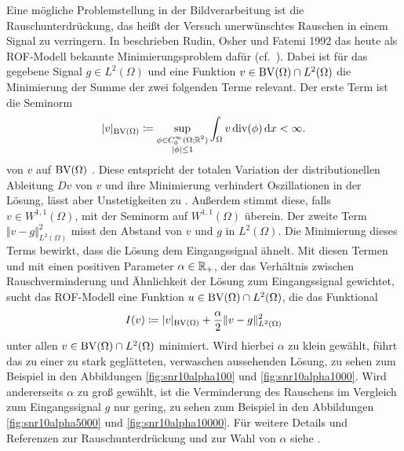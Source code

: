 Eine mögliche Problemstellung in der Bildverarbeitung ist die 
Rauschunterdrü\-ckung, das heißt der Versuch unerwünschtes Rauschen in einem
Signal zu verringern.
In \cite{ROF92} beschrieben Rudin, Osher und Fatemi 1992 das heute als
ROF-Modell bekannte Minimierungsproblem dafür (cf.\
\cites[1217]{Bar15a}[132]{CP10}[S. 74 f.]{Get12}).
Dabei ist für das gegebene Signal $g\in L^2(\Omega)$ und 
eine Funktion $v\in\textup{BV}(\Omega)\cap L^2(\Omega)$ die Minimierung
der Summe der zwei folgenden Terme relevant.
Der erste Term ist die
Seminorm
\begin{align*}
  |v|_{\textup{BV}(\Omega)}
  \coloneqq
  \sup_{\substack{\phi\in C^\infty_0(\Omega;\mathbb{R}^2)\\
  |\phi|\leq 1}}\int_\Omega v\operatorname{div} (\phi)\,\mathrm{d}x
  <
  \infty.
\end{align*}
von $v$ auf $\textup{BV}(\Omega)$ \cite[1162]{Bar12}. Diese entspricht der
totalen Variation der distributionellen Ableitung $Dv$ von $v$ und
ihre Minimierung verhindert Oszillationen in der Lösung, lässt aber
Unstetigkeiten zu \cite[72]{Get12}.
Außerdem stimmt diese, falls $v\in W^{1,1}(\Omega)$, mit der Seminorm auf
$W^{1,1}(\Omega)$ überein. 
Der zweite Term $\Vert v-g\Vert_{L^2(\Omega)}^2$ misst den Abstand von $v$ und
$g$ in $L^2(\Omega)$. 
Die Minimierung dieses Terms bewirkt, dass die Lösung dem Eingangssignal
ähnelt.
Mit diesen Termen und mit einen positiven Parameter
$\alpha\in\mathbb{R}_+$, der das Verhältnis zwischen Rauschverminderung und
Ähnlichkeit der Lösung zum Eingangssignal gewichtet, sucht das ROF-Modell
eine Funktion $u\in\textup{BV}(\Omega)\cap L^2(\Omega)$, die das Funktional
\begin{align}
  \label{eq:rofModel}
  I(v)\coloneqq |v|_{\textup{BV}(\Omega)}+\frac{\alpha}{2}\Vert
  v-g\Vert_{L^2(\Omega)}^2
\end{align}
unter allen $v\in\textup{BV}(\Omega)\cap L^2(\Omega)$ minimiert.
Wird hierbei $\alpha$ zu klein gewählt, führt das zu einer zu stark
geglätteten, verwaschen aussehenden Lösung, zu sehen zum Beispiel in den
Abbildungen \ref{fig:snr10alpha100} und \ref{fig:snr10alpha1000}. 
Wird andererseits $\alpha$ zu groß gewählt, ist die Verminderung des Rauschens
im Vergleich zum Eingangssignal $g$ nur gering, zu sehen zum Beispiel in den
Abbildungen \ref{fig:snr10alpha5000} und \ref{fig:snr10alpha10000}.
Für weitere Details und Referenzen zur Rauschunterdrückung und zur Wahl von
$\alpha$ siehe \cite{Get12}.

